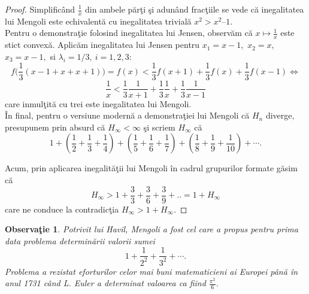 \documentclass[a4paper,12pt,oneside]{report}
\newtheorem{remark}{Observa\c{t}ie}
\begin{document}
\begin{proof}
Simplific\^{a}nd \(\frac{1}{x}\) din ambele p\u{a}r\c{t}i \c{s}i adun\^{a}nd frac\c{t}iile se vede c\u{a} inegalitatea lui Mengoli este echivalent\u{a} cu inegalitatea  trivial\u{a} \(x^{2} >  x^{2} – 1\). \\
Pentru o demonstra\c{t}ie folosind inegalitatea lui Jensen, observ\u{a}m c\u{a} \(x \mapsto \frac{1}{x}\) este stict convex\u{a}. Aplic\u{a}m inegalitatea lui Jensen pentru $x_1=x-1,$ $x_2=x,$ $x_3=x-1,$ si $\lambda_i=1/3,~i=1, 2, 3:$
\[
f\biggl(\frac{1}{3}(x-1+x+x+1)\biggr)=f(x)<\frac{1}{3}f(x+1)+\frac{1}{3}f(x)+\frac{1}{3}f(x-1)\Leftrightarrow
\]
\[
\frac{1}{x}<\frac{1}{3}\frac{1}{x+1}+\frac{1}{3}\frac{1}{x}+\frac{1}{3}\frac{1}{x-1}
\]
care inmul\c{t}it\u{a} cu trei este inegalitatea lui Mengoli.\\
\^{I}n final, pentru o versiune modern\u{a} a demonstra\c{t}iei lui Mengoli c\u{a} \(H_{n}\) diverge, presupunem prin absurd c\u{a} \(H_{\infty }< \infty\) \c{s}i scriem \(H_{\infty }\) c\u{a}
\begin{displaymath}
  1 + \left ( \frac{1}{2} + \frac{1}{3} + \frac{1}{4} \right ) + \left ( \frac{1}{5} + \frac{1}{6} + \frac{1}{7} \right ) + \left ( \frac{1}{8} + \frac{1}{9} +\frac{1}{10} \right )+\cdots.
\end{displaymath}

Acum, prin aplicarea inegalit\u{a}\c{t}ii lui Mengoli \^{i}n cadrul grupurilor formate g\u{a}sim c\u{a}
\[
H_{\infty }>1 + \frac{3}{3} + \frac{3}{6} + \frac{3}{9} + ..= 1 + H_{\infty }
\]
care ne conduce la contradic\c{t}ia \(H_{\infty } > 1 + H_{\infty }\).
\end{proof}
\begin{remark}
Potrivit lui Havil, Mengoli a fost cel care a propus pentru prima data problema determin\u{a}rii valorii sumei \[1 + \frac{1}{2^{2}} + \frac{1}{3^{2}} + \cdots.\]
Problema a rezistat eforturilor celor mai buni matematicieni ai Europei p\^{a}n\u{a} \^{i}n anul 1731 c\^{a}nd L. Euler a determinat valoarea ca fiind \(\frac{\pi^{2}}{6}\).
\end{remark}
\end{document}
